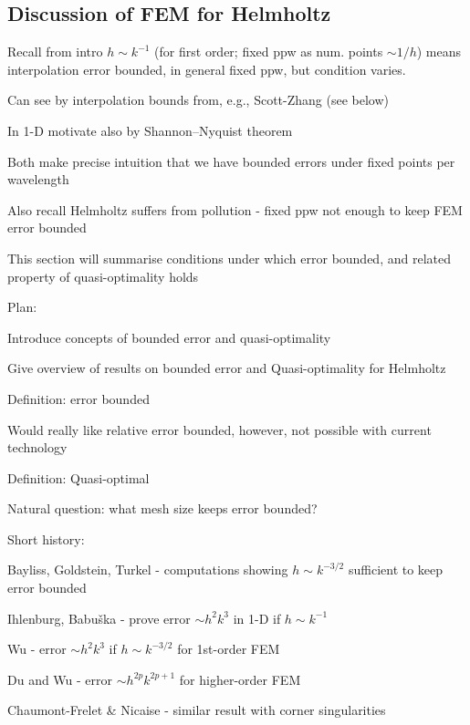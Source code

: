\subsection{Discussion of FEM for Helmholtz}\label{sec:helmfedisc}
\bit
\item Recall from intro $h\sim k^{-1}$ (for first order; fixed ppw as num. points $\sim 1/h$) means interpolation error bounded, in general fixed ppw, but condition varies.
\bit
\item Can see by interpolation bounds from, e.g., Scott-Zhang (see below)
\item In 1-D motivate also by Shannon--Nyquist theorem
\item Both make precise intuition that we have bounded errors under fixed points per wavelength
\eit
\item Also recall Helmholtz suffers from pollution - fixed ppw not enough to keep FEM error bounded
\item This section will summarise conditions under which error bounded, and related property of quasi-optimality holds
\item Plan:
\bit
\item Introduce concepts of bounded error and quasi-optimality
\item Give overview of results on bounded error and Quasi-optimality for Helmholtz
\eit
\eit
\bit
\item Definition: error bounded
\item Would really like relative error bounded, however, not possible with current technology
\item Definition: Quasi-optimal
\item Natural question: what mesh size keeps error bounded?
\item Short history:
\bit
\item Bayliss, Goldstein, Turkel - computations showing $h\sim k^{-3/2}$ sufficient to keep error bounded
\item Ihlenburg, Babu\v{s}ka - prove error $\sim h^2k^3$ in 1-D if $h \sim k^{-1}$
\item Wu - error $\sim h^2k^3$ if $h \sim k^{-3/2}$ for 1st-order FEM
\item Du and Wu - error $\sim h^{2p}k^{2p+1}$ for higher-order FEM
\item Chaumont-Frelet \& Nicaise - similar result with corner singularities
